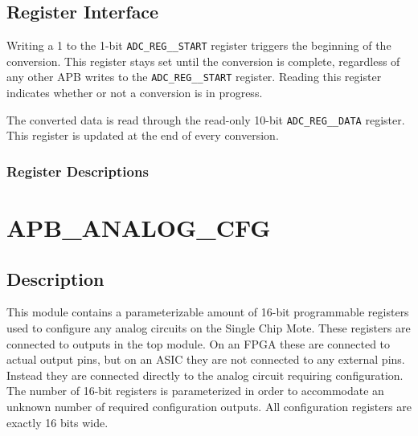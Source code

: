 \subsection{Register Interface} \label{adc-registers}
Writing a 1 to the 1-bit \texttt{ADC\_REG\_\_START} register triggers the beginning of the conversion. This register stays set until the conversion is complete, regardless of any other APB writes to the \texttt{ADC\_REG\_\_START} register. Reading this register indicates whether or not a conversion is in progress.

The converted data is read through the read-only 10-bit \texttt{ADC\_REG\_\_DATA} register. This register is updated at the end of every conversion.

\subsubsection{Register Descriptions}

\section{APB\_ANALOG\_CFG} \label{analog-cfg}
\subsection{Description}
This module contains a parameterizable amount of 16-bit programmable registers used to configure any analog circuits on the Single Chip Mote. These registers are connected to outputs in the top module. On an FPGA these are connected to actual output pins, but on an ASIC they are not connected to any external pins. Instead they are connected directly to the analog circuit requiring configuration. The number of 16-bit registers is parameterized in order to accommodate an unknown number of required configuration outputs. All configuration registers are exactly 16 bits wide.

